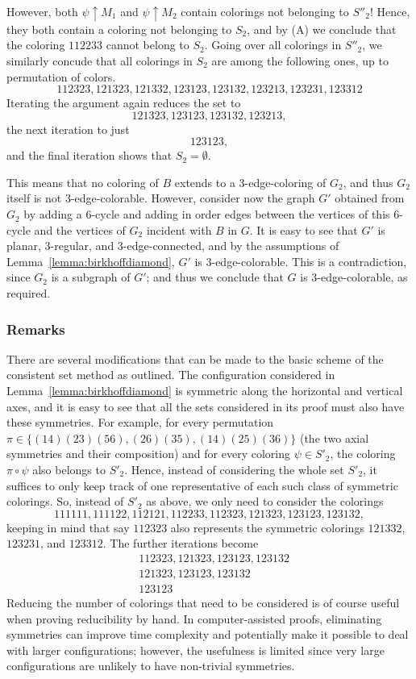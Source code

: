 \documentclass[12pt,twoside,openright,a4paper]{book}
\begin{document}
However, both $\psi\uparrow M_1$ and $\psi\uparrow M_2$ contain colorings not belonging to $S''_2$! Hence, they both contain a coloring not belonging to $S_2$, and by (A)
we conclude that the coloring $112233$ cannot belong to $S_2$.  Going over all colorings in $S''_2$, we similarly concude that all colorings in $S_2$ are among the following ones,
up to permutation of colors.
$$112323,121323,121332,123123,123132,123213,123231,123312$$
Iterating the argument again reduces the set to
$$121323,123123,123132,123213,$$
the next iteration to just
$$123123,$$
and the final iteration shows that $S_2=\emptyset$.

This means that no coloring of $B$ extends to a $3$-edge-coloring of $G_2$, and thus $G_2$ itself is not $3$-edge-colorable.  However, consider now the
graph $G'$ obtained from $G_2$ by adding a $6$-cycle and adding in order edges between the vertices of this $6$-cycle
and the vertices of $G_2$ incident with $B$ in $G$.  It is easy to see that $G'$ is planar, $3$-regular, and $3$-edge-connected,
and by the assumptions of Lemma~\ref{lemma:birkhoffdiamond}, $G'$ is $3$-edge-colorable.  This is a contradiction, since $G_2$ is
a subgraph of $G'$; and thus we conclude that $G$ is $3$-edge-colorable, as required.

\subsubsection{Remarks}

There are several modifications that can be made to the basic scheme of the consistent set method
as outlined.  The configuration considered in Lemma~\ref{lemma:birkhoffdiamond} is symmetric along the horizontal and vertical axes,
and it is easy to see that all the sets considered in its proof must also have these symmetries.
For example, for every permutation $\pi\in\{(14)(23)(56),(26)(35),(14)(25)(36)\}$ (the two axial symmetries and their composition)
and for every coloring $\psi\in S'_2$, the coloring $\pi\circ\psi$ also belongs to $S'_2$.  Hence, instead of considering the whole set $S'_2$,
it suffices to only keep track of one representative of each such class of symmetric colorings.  So, instead of $S'_2$ as above, we only need to
consider the colorings
$$111111,111122,112121,112233,112323,121323,123123,123132,$$
keeping in mind that say $112323$ also represents the symmetric colorings $121332$, $123231$, and $123312$.  The further iterations become
\begin{align*}
&112323,121323,123123,123132\\
&121323,123123,123132\\
&123123
\end{align*}
Reducing the number of colorings that need to be considered is of course useful when proving reducibility by hand.
In computer-assisted proofs, eliminating symmetries can improve time complexity and potentially make it possible
to deal with larger configurations; however, the usefulness is limited since very large configurations are unlikely
to have non-trivial symmetries.
\end{document}
